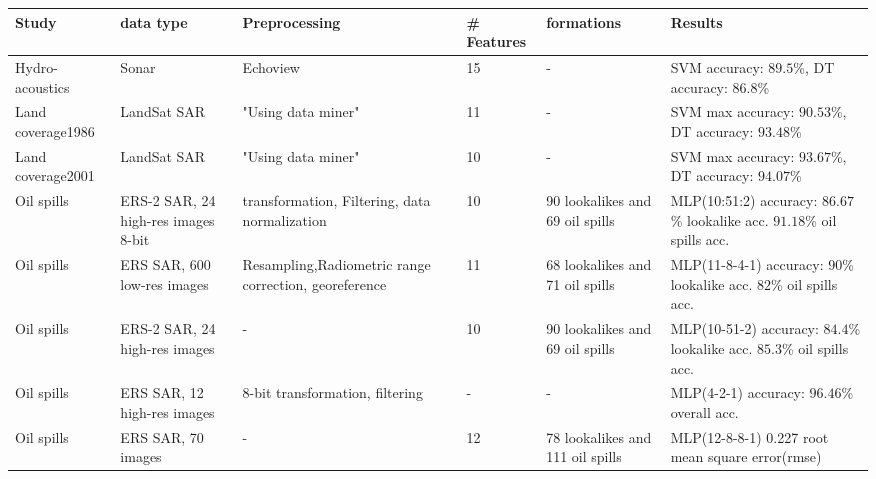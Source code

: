 \begin{table*}[t]

\advance\leftskip-3cm
\tabcolsep=0.19cm
\small
\centering


\begin{adjustbox}{width=\textwidth,totalheight=\textheight,keepaspectratio}
\begin{tabular}{*{6}{l}}

\toprule[1.5pt]
  Study & data type & Preprocessing & \# Features & formations & Results \\
    \hline
  
    Hydro-acoustics \cite{Robotham2011170} & Sonar & Echoview & 15 &  - & SVM accuracy: $89.5$\%, DT accuracy: $86.8$\% \\

    Land coverage1986 \cite{Otukei2010S27} & LandSat SAR & "Using data miner" & 11 &  - & SVM max accuracy: $90.53$\%, DT accuracy: $93.48$\% \\

    Land coverage2001 \cite{Otukei2010S27} & LandSat SAR & "Using data miner" & 10 &  - & SVM max accuracy: $93.67$\%, DT accuracy: $94.07$\% \\ 
    
    Oil spills\cite{Topouzelis200762} & ERS-2 SAR, 24 high-res images 8-bit & transformation, Filtering, data normalization & 10 & 90 lookalikes and 69 oil spills & MLP(10:51:2) accuracy: $86.67$\% lookalike acc. $91.18$\% oil spills acc.\\
    
    Oil spills\cite{Delfrate200038} & ERS SAR, 600 low-res images & Resampling,Radiometric range correction, georeference & 11 & 68 lookalikes and 71 oil spills & MLP(11-8-4-1) accuracy: $90$\% lookalike acc. $82$\% oil spills acc.\\
    
    Oil spills\cite{Topouzelis200930} &  ERS-2 SAR, 24 high-res images & - & 10 & 90 lookalikes and 69 oil spills & MLP(10-51-2) accuracy: $84.4$\% lookalike acc. $85.3$\% oil spills acc.\\
    
    Oil spills\cite{Topouzelis200924} &  ERS SAR, 12 high-res images & 8-bit transformation, filtering & - & - & MLP(4-2-1) accuracy: $96.46$\% overall acc. \\
 
    Oil spills\cite{Delfrate2004} &  ERS SAR, 70 images & - & 12 & 78 lookalikes and 111 oil spills & MLP(12-8-8-1) 0.227 root mean square error(rmse)\\
    

\end{tabular}
\end{adjustbox}
\end{table*}
